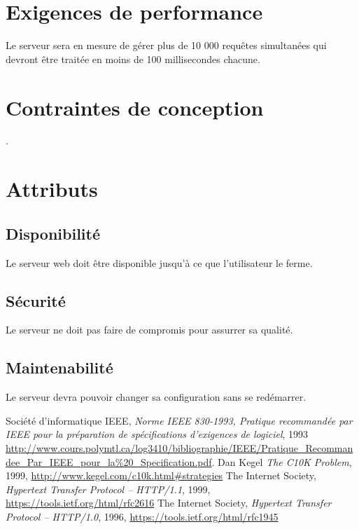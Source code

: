 \documentclass{scrreprt}
\begin{document}
\section{Exigences de performance} Le serveur sera en mesure de gérer plus de 10 000 requêtes simultanées qui devront être traitée en moins de 100 millisecondes chacune. 
\section{Contraintes de conception} .
\section{Attributs}
\subsection{Disponibilité}
Le serveur web doit être disponible jusqu'à ce que l'utilisateur le ferme.
\subsection{Sécurité}
Le serveur ne doit pas faire de compromis pour assurrer sa qualité.
\subsection{Maintenabilité}
Le serveur devra pouvoir changer sa configuration sans se redémarrer.


\begin{thebibliography}{9}
  Société d'informatique IEEE,
\emph{Norme IEEE 830-1993, Pratique recommandée par IEEE pour la préparation de
spécifications d’exigences de logiciel}, 1993
\url{http://www.cours.polymtl.ca/log3410/bibliographie/IEEE/Pratique_Recommandee_Par_IEEE_pour_la%20_Specification.pdf}.
  Dan Kegel
\emph{The C10K Problem}, 1999, \url{http://www.kegel.com/c10k.html#strategies}
    The Internet Society,
\emph{Hypertext Transfer Protocol -- HTTP/1.1}, 1999,
\url{https://tools.ietf.org/html/rfc2616}
    The Internet Society,
\emph{Hypertext Transfer Protocol -- HTTP/1.0}, 1996,
\url{https://tools.ietf.org/html/rfc1945}
\end{thebibliography}

\end{document}
